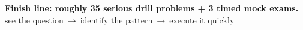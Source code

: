 \documentclass[11pt]{article}
\begin{document}
\begin{tcolorbox}[
  enhanced,
  colback=PlanGold!8,
  colframe=PlanGold!80!black,
  boxrule=0.8pt,
  arc=2mm,
  left=2mm,right=2mm,top=1.4mm,bottom=1.4mm
]
\centering
\textbf{\color{PlanNavy}Finish line: roughly 35 serious drill problems + 3 timed mock exams.}\\[-0.1em]
\(\boxed{\text{see the question}\ \longrightarrow\ \text{identify the pattern}\ \longrightarrow\ \text{execute it quickly}}\)
\end{tcolorbox}
\end{document}
